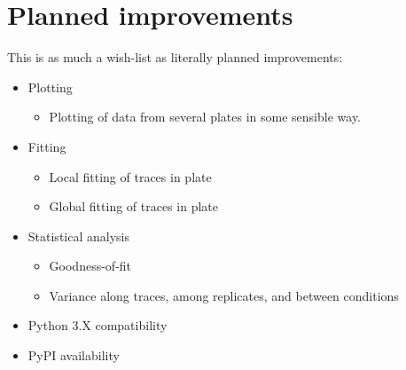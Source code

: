 \documentclass[letterpaper,10pt,english]{sphinxmanual}
\begin{document}
\section{Planned improvements}
\label{\detokenize{contribute:planned-improvements}}
This is as much a wish-list as literally planned improvements:
\begin{itemize}
\item {} 
Plotting
\begin{itemize}
\item {} 
Plotting of data from several plates in some sensible way.

\end{itemize}

\item {} 
Fitting
\begin{itemize}
\item {} 
Local fitting of traces in plate

\item {} 
Global fitting of traces in plate

\end{itemize}

\item {} 
Statistical analysis
\begin{itemize}
\item {} 
Goodness-of-fit

\item {} 
Variance along traces, among replicates, and between conditions

\end{itemize}

\item {} 
Python 3.X compatibility

\item {} 
PyPI availability

\end{itemize}



\renewcommand{\indexname}{Index}
\printindex
\end{document}
